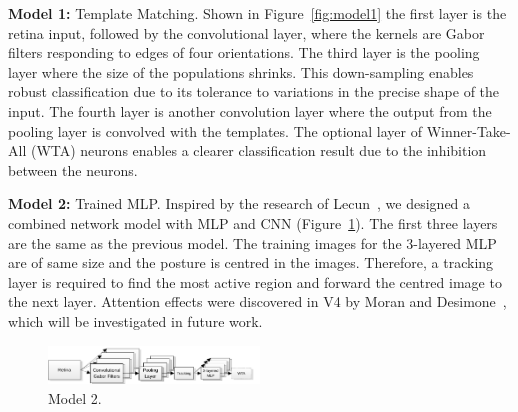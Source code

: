 \documentclass[journal]{journal}
\begin{document}
\textbf{Model 1: }
Template Matching. Shown in Figure~\ref{fig:model1} the first layer is the retina input, followed by the convolutional layer, where the kernels are Gabor filters responding to edges of four orientations.
The third layer is the pooling layer where the size of the populations shrinks. 
This down-sampling enables robust classification due to its tolerance to variations in the precise shape of the input. 
The fourth layer is another convolution layer where the output from the pooling layer is convolved with the templates.
The optional layer of Winner-Take-All (WTA) neurons enables a clearer classification result due to the inhibition between the neurons.
%

\textbf{Model 2: }
Trained MLP. 
Inspired by the research of Lecun~\cite{lecun1998gradient}, we designed a combined network model with MLP and CNN (Figure~\ref{fig:model2}). 
The first three layers are the same as the previous model.
The training images for the 3-layered MLP are of same size and the posture is centred in the images.
Therefore, a tracking layer is required to find the most active region and forward the centred image to the next layer.
Attention effects were discovered in V4 by Moran and Desimone~\cite{moran1985selective}, which will be investigated in future work.

\begin{figure}[h!]
\centering
	\includegraphics[width=0.5\textwidth]{pics/model2.pdf}
	\caption{Model 2. 
	}
	\label{fig:model2}
\end{figure}
\end{document}
